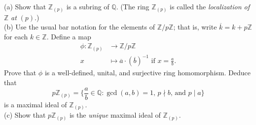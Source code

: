 \documentclass[12pt,twoside,a4paper]{article}
\theoremstyle{definition}
\theoremstyle{definition}
\newcommand{\Z}{\mathbb{Z}}
\newcommand{\Q}{\mathbb{Q}}
\newcommand{\divides}{\mid}
\newcommand{\ndivides}{\nmid}
\newcommand{\set}[1]{\{#1\}}
\begin{document}
(a) Show that $\Z_{(p)}$ is a subring of $\Q$. (The ring $\Z_{(p)}$ is called the \textit{localization of }$\Z$\textit{ at }$(p)$.)\\
(b) Use the usual bar notation for the elements of $\Z/p\Z$; that is, write $\overline{k}=k+p\Z$ for each $k\in\Z$. Define a map
\begin{align*}
	\phi:\Z_{(p)}	&\to\Z/p\Z\\
	x		&\mapsto \overline{a}\cdot(\overline{b})^{-1}\text{ if }x=\frac{a}{b}.
\end{align*}
Prove that $\phi$ is a well-defined, unital, and surjective ring homomorphism. Deduce that
\begin{equation*}
	p\Z_{(p)}=\set{\frac{a}{b}\in\Q:\gcd(a,b)=1\text{, }p\ndivides b\text{, and }p\divides a}
\end{equation*}
is a maximal ideal of $\Z_{(p)}$.\\
(c) Show that $p\Z_{(p)}$ is the \textit{unique} maximal ideal of $\Z_{(p)}$.
\end{document}
